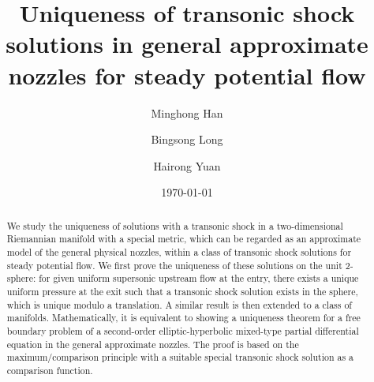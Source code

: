 \documentclass[reqno,12pt]{amsart}
\numberwithin{equation}{section}
\begin{document}
	
	\title[Uniqueness of transonic shock solutions]{Uniqueness of transonic shock solutions in general approximate nozzles for steady potential flow }
	
        \author{Minghong Han}
        \author{Bingsong Long}	
	\author{Hairong Yuan}
	

\address[Minghong Han]{Center for Partial Differential Equations, School of Mathematical Sciences, East China Normal University, Shanghai 200241, China}

\address[Bingsong Long]{School of Mathematics and Statistics, Huanggang Normal University, Hubei 438000, China}

\address[Hairong Yuan]{School of Mathematical Sciences,  Key Laboratory of Mathematics and Engineering Applications (Ministry of Education) \& Shanghai Key Laboratory of PMMP,  East China Normal University, Shanghai 200241, China}
	

	

	
	
	\date{\today}
	
	
	
	\begin{abstract}
We study the uniqueness of solutions with a transonic shock in a two-dimensional Riemannian manifold with a special metric, which can be regarded as an approximate model of the general physical nozzles, within a class of transonic shock solutions for steady potential flow. We first prove the uniqueness of these solutions on the unit 2-sphere: for given uniform supersonic upstream flow at the entry, there exists a unique uniform pressure at the exit such that a transonic shock solution exists in the sphere, which is unique modulo a translation. A similar result is then extended to a class of manifolds. Mathematically, it is equivalent to showing a uniqueness theorem for a free boundary problem of a second-order elliptic-hyperbolic mixed-type partial differential equation in the general approximate nozzles. The proof is based on the maximum/comparison principle with a suitable special transonic shock solution as a comparison function.
	\end{abstract}
	
	
	\allowbreak
	\allowdisplaybreaks	
	\maketitle
	
\end{document}
